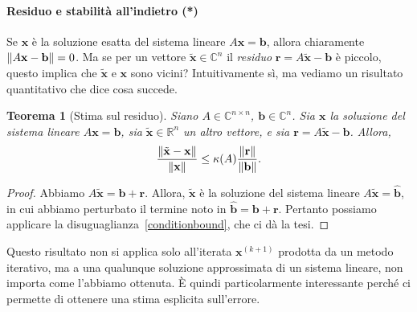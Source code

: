 \documentclass[a4paper]{report}
\DeclarePairedDelimiter{\norm}{\lVert}{\rVert}
\newtheorem{theorem}{Teorema}[chapter]
\theoremstyle{definiton}
\theoremstyle{remark}
\newcommand{\x}{\mathbf{x}}
\newcommand{\e}{\mathbf{e}}
\renewcommand{\b}{\mathbf{b}}
\begin{document}


\paragraph{Residuo e stabilità all'indietro (*)}  Se $\x$ è la soluzione esatta del sistema lineare $A\x = \b$, allora chiaramente $\norm{A\x-\b} = 0$. Ma se per un vettore $\tilde{\x} \in \mathbb{C}^n$ il \emph{residuo} $\mathbf{r} = A\tilde{\x}-\b$ è piccolo, questo implica che $\tilde{\x}$ e $\x$ sono vicini? Intuitivamente sì, ma vediamo un risultato quantitativo che dice cosa succede.

\begin{theorem}[Stima sul residuo]
Siano $A \in \mathbb{C}^{n\times n}$, $\b\in\mathbb{C}^n$. Sia $\x$ la soluzione del sistema lineare $A\x=\b$, sia $\tilde{\x}\in\mathbb{R}^n$ un altro vettore, e sia $\mathbf{r} = A\tilde{\x}-\b$. Allora,
\[
\frac{\norm{\tilde{\x}-\x}}{\norm{\x}} \leq \kappa(A) \frac{\norm{\mathbf{r}}}{\norm{\b}}.
\]
\end{theorem}
\begin{proof}
Abbiamo $A\tilde{\x} = \b + \mathbf{r}$. Allora, $\tilde{\x}$ è la soluzione del sistema lineare $A\tilde{\x} = \widehat{\b}$, in cui abbiamo perturbato il termine noto in $\widehat{\b} = \b + \mathbf{r}$. Pertanto possiamo applicare la disuguaglianza~\eqref{conditionbound}, che ci dà la tesi.
\end{proof}
Questo risultato non si applica solo all'iterata $\x^{(k+1)}$ prodotta da un metodo iterativo, ma a una qualunque soluzione approssimata di un sistema lineare, non importa come l'abbiamo ottenuta. È quindi particolarmente interessante perché ci permette di ottenere una stima esplicita sull'errore.
\end{document}
